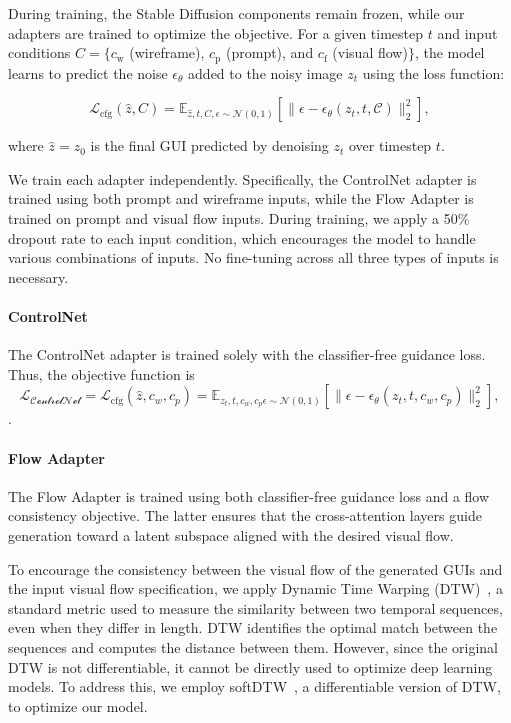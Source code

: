 During training, the Stable Diffusion components remain frozen, while our adapters are trained to optimize the objective.
For a given timestep $t$ and input conditions $C = \{c_\mathrm{w}$ (wireframe), $c_\mathrm{p}$ (prompt), and $c_\mathrm{f}$ (visual flow)$\}$, the model learns to predict the noise $\epsilon_{\theta}$ added to the noisy image $z_t$ using the loss function:

\begin{equation}
    \mathcal{L}_{\textrm{cfg}}(\hat{z}, C) = \mathbb{E}_{\hat{z}, t, C, \epsilon \sim \mathcal{N}(0,1)} [\| \epsilon - \epsilon_{\theta}(z_t, t, \mathcal{C}) \|^{2}_2],
\end{equation}

\noindent where $\hat{z} = z_0$ is the final GUI predicted by denoising $z_t$ over timestep $t$. 


We train each adapter independently. Specifically, the ControlNet adapter is trained using both prompt and wireframe inputs, while the Flow Adapter is trained on prompt and visual flow inputs. During training, we apply a 50\% dropout rate to each input condition, which encourages the model to handle various combinations of inputs. No fine-tuning across all three types of inputs is necessary.

\paragraph{ControlNet} 
The ControlNet adapter is trained solely with the classifier-free guidance loss. Thus, the objective function is  
\begin{equation}
  \mathcal{L_\textrm{ControlNet}} =  \mathcal{L}_{\textrm{cfg}}(\hat{z}, c_w, c_p) = \mathbb{E}_{z_t, t, c_w, c_p \epsilon \sim \mathcal{N}(0,1)} [\| \epsilon - \epsilon_{\theta}(z_t, t, c_w, c_p) \|^{2}_2],
\end{equation}.


\paragraph{Flow Adapter} 
The Flow Adapter is trained using both classifier-free guidance loss and a flow consistency objective. The latter ensures that the cross-attention layers guide generation toward a latent subspace aligned with the desired visual flow.

To encourage the consistency between the visual flow of the generated GUIs and the input visual flow specification, we apply Dynamic Time Warping (DTW)~\cite{dtw}, a standard metric used to measure the similarity between two temporal sequences, even when they differ in length. DTW identifies the optimal match between the sequences and computes the distance between them. However, since the original DTW is not differentiable, it cannot be directly used to optimize deep learning models.
To address this, we employ softDTW~\cite{soft-dtw}, a differentiable version of DTW, to optimize our model.

